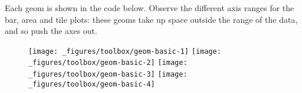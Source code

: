 Each geom is shown in the code below. Observe the different axis ranges
for the bar, area and tile plots: these geoms take up space outside the
range of the data, and so push the axes out.

\begin{Shaded}
\begin{Highlighting}[]
\StringTok{ }\NormalTok{(}
   \NormalTok{(}\NormalTok{, }\NormalTok{, }\NormalTok{), }
   \NormalTok{(}\NormalTok{, }\NormalTok{, }\NormalTok{), }
   \NormalTok{(}\NormalTok{,}\NormalTok{,}\NormalTok{)}
\NormalTok{)}
\StringTok{ }\OperatorTok{+}\StringTok{ }
\StringTok{  }\NormalTok{(} \NormalTok{, } \NormalTok{) }\OperatorTok{+}\StringTok{ }
\StringTok{  }\NormalTok{(} \NormalTok{(} \NormalTok{)) }
\OperatorTok{+}\StringTok{ }\NormalTok{() }\OperatorTok{+}\StringTok{ }\NormalTok{(}\NormalTok{)}
\OperatorTok{+}\StringTok{ }\NormalTok{() }\OperatorTok{+}\StringTok{ }\NormalTok{(}\NormalTok{)}
\OperatorTok{+}\StringTok{ }\NormalTok{(} \NormalTok{) }\OperatorTok{+}\StringTok{ }\NormalTok{(}\NormalTok{)}
\OperatorTok{+}\StringTok{ }\NormalTok{() }\OperatorTok{+}\StringTok{ }\NormalTok{(}\NormalTok{)}
\end{Highlighting}
\end{Shaded}

\begin{figure}[H]
  \texttt{[image: \_figures/toolbox/geom-basic-1]}%
  \texttt{[image: \_figures/toolbox/geom-basic-2]}%
  \texttt{[image: \_figures/toolbox/geom-basic-3]}%
  \texttt{[image: \_figures/toolbox/geom-basic-4]}
\end{figure}

